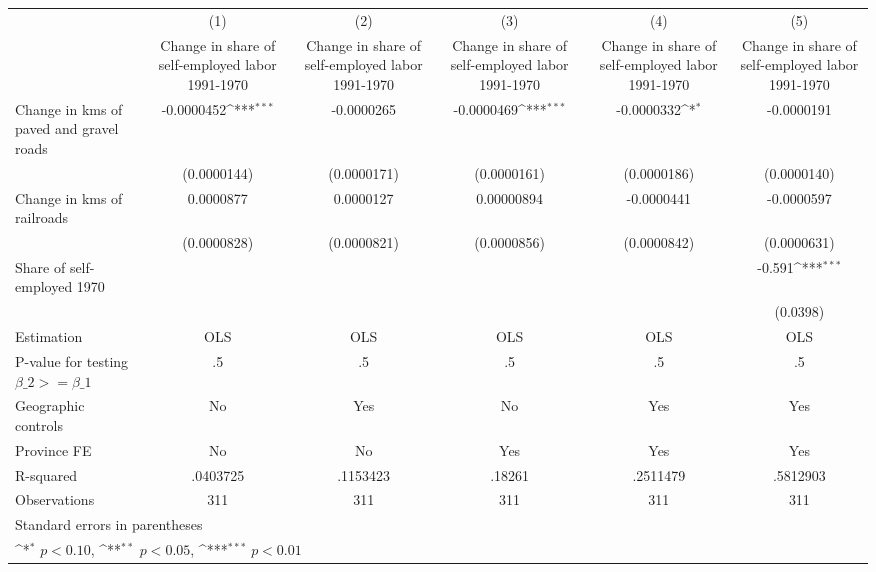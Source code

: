 {
\def\sym#1{\ifmmode^{#1}\else\(^{#1}\)\fi}
\begin{tabular}{l*{5}{c}}
\hline\hline
                    &\multicolumn{1}{c}{(1)}&\multicolumn{1}{c}{(2)}&\multicolumn{1}{c}{(3)}&\multicolumn{1}{c}{(4)}&\multicolumn{1}{c}{(5)}\\
                    &\multicolumn{1}{c}{Change in share of self-employed labor 1991-1970}&\multicolumn{1}{c}{Change in share of self-employed labor 1991-1970}&\multicolumn{1}{c}{Change in share of self-employed labor 1991-1970}&\multicolumn{1}{c}{Change in share of self-employed labor 1991-1970}&\multicolumn{1}{c}{Change in share of self-employed labor 1991-1970}\\
\hline
Change in kms of paved and gravel roads&  -0.0000452\sym{***}&  -0.0000265         &  -0.0000469\sym{***}&  -0.0000332\sym{*}  &  -0.0000191         \\
                    & (0.0000144)         & (0.0000171)         & (0.0000161)         & (0.0000186)         & (0.0000140)         \\
[1em]
Change in kms of railroads&   0.0000877         &   0.0000127         &  0.00000894         &  -0.0000441         &  -0.0000597         \\
                    & (0.0000828)         & (0.0000821)         & (0.0000856)         & (0.0000842)         & (0.0000631)         \\
[1em]
Share of self-employed 1970&                     &                     &                     &                     &      -0.591\sym{***}\\
                    &                     &                     &                     &                     &    (0.0398)         \\
\hline
Estimation          &         OLS         &         OLS         &         OLS         &         OLS         &         OLS         \\
P-value for testing $\beta\_2 >= \beta\_1$&          .5         &          .5         &          .5         &          .5         &          .5         \\
Geographic controls &          No         &         Yes         &          No         &         Yes         &         Yes         \\
Province FE         &          No         &          No         &         Yes         &         Yes         &         Yes         \\
R-squared           &    .0403725         &    .1153423         &      .18261         &    .2511479         &    .5812903         \\
Observations        &         311         &         311         &         311         &         311         &         311         \\
\hline\hline
\multicolumn{6}{l}{\footnotesize Standard errors in parentheses}\\
\multicolumn{6}{l}{\footnotesize \sym{*} \(p<0.10\), \sym{**} \(p<0.05\), \sym{***} \(p<0.01\)}\\
\end{tabular}
}
